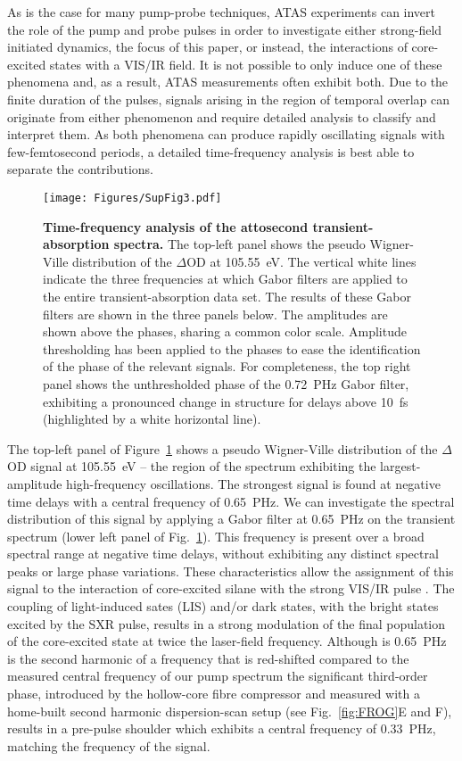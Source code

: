 \documentclass[12pt]{article}
\begin{document}
As is the case for many pump-probe techniques, ATAS experiments can invert the role of the pump and probe pulses in order to investigate either strong-field initiated dynamics, the focus of this paper, or instead, the interactions of core-excited states with a VIS/IR field. It is not possible to only induce one of these phenomena and, as a result, ATAS measurements often exhibit both. Due to the finite duration of the pulses, signals arising in the region of temporal overlap can originate from either phenomenon and require detailed analysis to classify and interpret them. As both phenomena can produce rapidly oscillating signals with few-femtosecond periods, a detailed time-frequency analysis is best able to separate the contributions. 

\begin{figure}
\texttt{[image: Figures/SupFig3.pdf]}
\caption{\label{Gabor}\textbf{Time-frequency analysis of the attosecond transient-absorption spectra.} The top-left panel shows the pseudo Wigner-Ville distribution of the $\Delta$OD at 105.55~eV. The vertical white lines indicate the three frequencies at which Gabor filters are applied to the entire transient-absorption data set. The results of these Gabor filters are shown in the three panels below. The amplitudes are shown above the phases, sharing a common color scale. Amplitude thresholding has been applied to the phases to ease the identification of the phase of the relevant signals. For completeness, the top right panel shows the unthresholded phase of the 0.72~PHz Gabor filter, exhibiting a pronounced change in structure for delays above 10~fs (highlighted by a white horizontal line). 
}
\end{figure}

The top-left panel of Figure~\ref{Gabor} shows a pseudo Wigner-Ville distribution of the $\Delta$OD signal at 105.55~eV -- the region of the spectrum exhibiting the largest-amplitude high-frequency oscillations. The strongest signal is found at negative time delays with a central frequency of 0.65~PHz. We can investigate the spectral distribution of this signal by applying a Gabor filter at 0.65~PHz on the transient spectrum (lower left panel of Fig.~\ref{Gabor}). This frequency is present over a broad spectral range at negative time delays, without exhibiting any distinct spectral peaks or large phase variations. These characteristics allow the assignment of this signal to the interaction of core-excited silane with the strong VIS/IR pulse \cite{chen13}. The coupling of light-induced sates (LIS) and/or dark states, with the bright states excited by the SXR pulse, results in a strong modulation of the final population of the core-excited state at twice the laser-field frequency. Although is 0.65~PHz is the second harmonic of a frequency that is red-shifted compared to the measured central frequency of our pump spectrum the significant third-order phase, introduced by the hollow-core fibre compressor and measured with a home-built second harmonic dispersion-scan setup (see Fig.~\ref{fig:FROG}E and F), results in a pre-pulse shoulder which exhibits a central frequency of 0.33~PHz, matching the frequency of the signal. 
\end{document}
